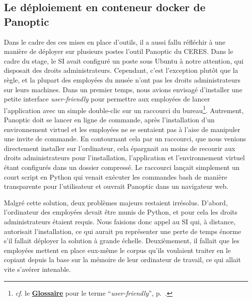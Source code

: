 \subsection{Le déploiement en conteneur docker de Panoptic}

Dans le cadre des ces mises en place d'outils, il a aussi fallu réfléchir à une manière de déployer sur plusieurs postes l'outil Panoptic du CERES. Dans le cadre du stage, le SI avait configuré un poste sous Ubuntu à notre attention, qui disposait des droits administrateurs. Cependant, c'est l'exception plutôt que la règle, et la plupart des employé\wokisme e\wokisme s du musée n'ont pas les droits administrateurs sur leurs machines. Dans un premier temps, nous avions envisagé d'installer une petite interface \textit{user-friendly} pour permettre aux employé\wokisme e\wokisme s de lancer l'application avec un simple double-clic sur un raccourci du bureau\footnote{\textit{cf}. le \textbf{\hyperref[sec:Glossaire]{Glossaire}} pour le terme \enquote{\textit{user-friendly}}, p.~\pageref{sec:Glossaire}.}. Autrement, Panoptic doit se lancer en ligne de commande, après l'installation d'un environnement virtuel et les employé\wokisme e\wokisme s ne se sentaient pas à l'aise de manipuler une invite de commande. En contournant cela par un raccourci, que nous venions directement installer sur l'ordinateur, cela épargnait au moins de recourir aux droits administrateurs pour l'installation, l'application et l'environnement virtuel étant configurés dans un dossier compressé. Le raccourci lançait simplement un court script en Python qui venait exécuter les commandes bash de manière transparente pour l'utilisateur et ouvrait Panoptic dans un navigateur web. 

Malgré cette solution, deux problèmes majeurs restaient irrésolus. D'abord, l'ordinateur des employé\wokisme e\wokisme s devait être munis de Python, et pour cela les droits administrateurs étaient requis. Nous faisions donc appel au SI qui, à distance, autorisait l'installation, ce qui aurait pu représenter une perte de temps énorme s'il fallait déployer la solution à grande échelle. Deuxièmement, il fallait que les employé\wokisme e\wokisme s mettent en place eux-même le corpus qu'ils voulaient traiter en le copiant depuis la base sur la mémoire de leur ordinateur de travail, ce qui allait vite s'avérer intenable. \hfill \break

